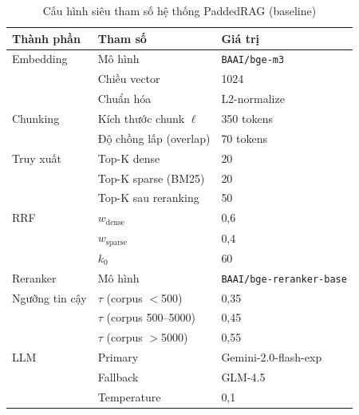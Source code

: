 \documentclass[12pt,a4paper]{report}
\theoremstyle{plain}
\theoremstyle{definition}
\begin{document}
	\begin{table}[htbp]
		\centering
		\caption{Cấu hình siêu tham số hệ thống PaddedRAG (baseline)}
		\label{tab:paddedrag_config}
		\begin{tabular}{lll}
			\toprule
			\textbf{Thành phần}       & \textbf{Tham số}              & \textbf{Giá trị}            \\
			\midrule
			Embedding                 & Mô hình                       & \texttt{BAAI/bge-m3}        \\
			                          & Chiều vector                  & 1024                        \\
			                          & Chuẩn hóa                    & L2-normalize                \\
			\midrule
			Chunking                  & Kích thước chunk $\ell$       & 350 tokens                  \\
			                          & Độ chồng lấp (overlap)        & 70 tokens                   \\
			\midrule
			Truy xuất                 & Top-K dense                   & 20                          \\
			                          & Top-K sparse (BM25)           & 20                          \\
			                          & Top-K sau reranking           & 50                          \\
			\midrule
			RRF                       & $w_{\text{dense}}$            & 0,6                         \\
			                          & $w_{\text{sparse}}$           & 0,4                         \\
			                          & $k_0$                         & 60                          \\
			\midrule
			Reranker                  & Mô hình                       & \texttt{BAAI/bge-reranker-base} \\
			\midrule
			Ngưỡng tin cậy            & $\tau$ (corpus $<$500)        & 0,35                        \\
			                          & $\tau$ (corpus 500--5000)     & 0,45                        \\
			                          & $\tau$ (corpus $>$5000)       & 0,55                        \\
			\midrule
			LLM                       & Primary                       & Gemini-2.0-flash-exp        \\
			                          & Fallback                      & GLM-4.5                     \\
			                          & Temperature                   & 0,1                         \\
			\bottomrule
		\end{tabular}
	\end{table}
\end{document}
